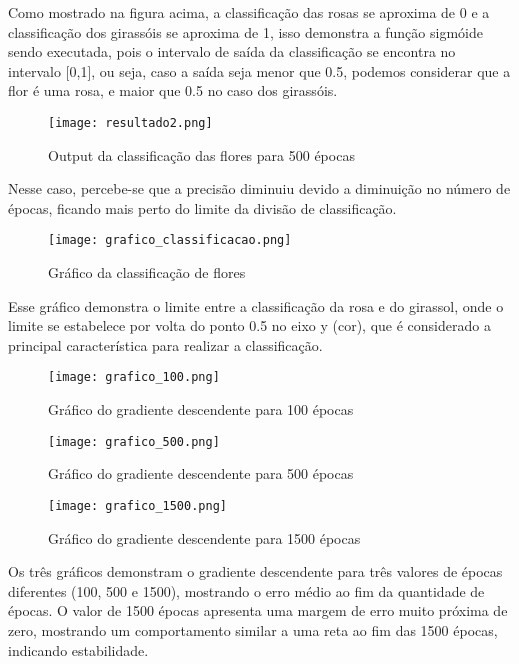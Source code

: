 \documentclass[12pt]{article}
\begin{document}
Como mostrado na figura acima, a classificação das rosas se aproxima de 0 e a classificação dos girassóis se aproxima de 1, isso demonstra a função sigmóide sendo executada, pois o intervalo de saída da classificação se encontra no intervalo [0,1], ou seja, caso a saída seja menor que 0.5, podemos considerar que a flor é uma rosa, e maior que 0.5 no caso dos girassóis.\\

\begin{figure}[H]
  \centering
  \texttt{[image: resultado2.png]}
  \caption{Output da classificação das flores para 500 épocas}
\end{figure}

Nesse caso, percebe-se que a precisão diminuiu devido a diminuição no número de épocas, ficando mais perto do limite da divisão de classificação.

\begin{figure}[H]
  \centering
  \texttt{[image: grafico\_classificacao.png]}
  \caption{Gráfico da classificação de flores}
\end{figure}

Esse gráfico demonstra o limite entre a classificação da rosa e do girassol, onde o limite se estabelece por volta do ponto 0.5 no eixo y (cor), que é considerado a principal característica para realizar a classificação.

\begin{figure}[H]
  \centering
  \texttt{[image: grafico\_100.png]}
  \caption{Gráfico do gradiente descendente para 100 épocas}
\end{figure}

\begin{figure}[H]
  \centering
  \texttt{[image: grafico\_500.png]}
  \caption{Gráfico do gradiente descendente para 500 épocas}
\end{figure}

\begin{figure}[H]
  \centering
  \texttt{[image: grafico\_1500.png]}
  \caption{Gráfico do gradiente descendente para 1500 épocas}
\end{figure}

Os três gráficos demonstram o gradiente descendente para três valores de épocas diferentes (100, 500 e 1500), mostrando o erro médio ao fim da quantidade de épocas. O valor de 1500 épocas apresenta uma margem de erro muito próxima de zero, mostrando um comportamento similar a uma reta ao fim das 1500 épocas, indicando estabilidade.
\end{document}
